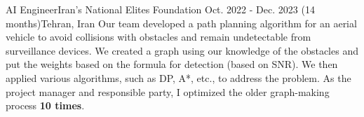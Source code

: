 \resumeSubheadingReza
{AI Engineer}{Iran's National Elites Foundation}
{Oct. 2022 - Dec. 2023 (14 months)}{Tehran, Iran}
{Our team developed a path planning algorithm for an aerial vehicle to avoid collisions with obstacles and remain undetectable from surveillance devices.
 We created a graph using our knowledge of the obstacles and put the weights based on the formula for detection (based on SNR). We then applied various algorithms, such as DP, A*, etc., to address the problem.
 As the project manager and responsible party, I optimized the older graph-making process \textbf{10 times}.}
